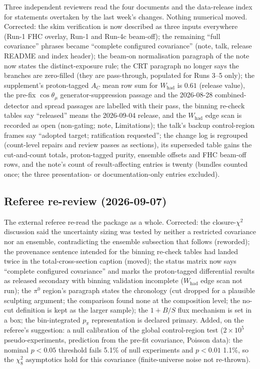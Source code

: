 Three independent reviewers read the four documents and the data-release index for
statements overtaken by the last week's changes. Nothing numerical moved. Corrected: the
skim verification is now described as three inputs everywhere (Run-1 FHC overlay, Run-1 and
Run-4c beam-off); the remaining ``full covariance'' phrases became ``complete configured
covariance'' (note, talk, release README and index header); the beam-on normalisation
paragraph of the note now states the distinct-exposure rule; the CRT paragraph no longer
says the branches are zero-filled (they are pass-through, populated for Runs 3--5 only);
the supplement's proton-tagged $A_C$ mean row sum for $W_\mathrm{had}$ is $0.61$ (release
value), the pre-fix $\cos\theta_\mu$ generator-suppression passage and the 2026-08-28
combined-detector and spread passages are labelled with their pass, the binning re-check
tables say ``released'' means the 2026-09-04 release, and the $W_\mathrm{had}$ edge scan is
recorded as open (non-gating; note, Limitations); the talk's backup control-region frames
say ``adopted target; ratification requested''; the change log is regrouped (count-level
repairs and review passes as sections), its superseded table gains the cut-and-count
totals, proton-tagged purity, ensemble offsets and FHC beam-off rows, and the note's
count of result-affecting entries is twenty (bundles counted once; the three
presentation- or documentation-only entries excluded).

\subsection{Referee re-review (2026-09-07)}

The external referee re-read the package as a whole. Corrected: the closure-$\chi^2$
discussion said the uncertainty sizing was tested by neither a restricted covariance nor an
ensemble, contradicting the ensemble subsection that follows (reworded); the provenance
sentence intended for the binning re-check tables had landed twice in the total-cross-section
caption (moved); the status matrix now says ``complete configured covariance'' and marks the
proton-tagged differential results as released secondary with binning validation incomplete
($W_\mathrm{had}$ edge scan not run); the $\pi^0$ region's paragraph states the chronology
(cut dropped for a plausible sculpting argument; the comparison found none at the
composition level; the no-cut definition is kept as the larger sample); the $1+B/S$ flux
mechanism is set in a box; the bin-integrated $p_\pi$ representation is declared primary.
Added, on the referee's suggestion: a null calibration of the global control-region test
($2\times10^5$ pseudo-experiments, prediction from the pre-fit covariance, Poisson data):
the nominal $p<0.05$ threshold fails 5.1\% of null experiments and $p<0.01$ 1.1\%, so
the $\chi^2_8$ asymptotics hold for this covariance (finite-universe noise not re-thrown).

